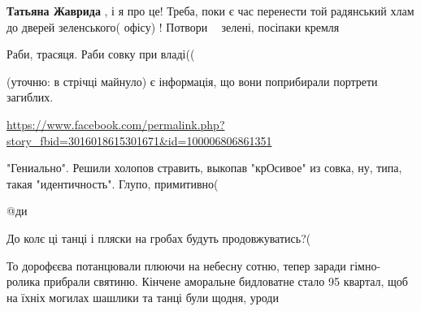 \begin{itemize}
\begin{itemize}
\textbf{Татьяна Жаврида} , і я про це! Треба, поки є час перенести той
радянський хлам до дверей зеленського( офісу) ! Потвори 🤡🤮 зелені, посіпаки
кремля
\end{itemize}

 
Раби, трасяця. Раби совку при владі((

 
(уточню: в стрічці майнуло) є інформація, що вони поприбирали портрети загиблих.

\url{https://www.facebook.com/permalink.php?story_fbid=3016018615301671&id=100006806861351}

 
"Гениально". Решили холопов стравить, выкопав "крОсивое" из совка, ну, типа, такая "идентичность". Глупо, примитивно(

 
@ди

 

До колє ці танці і пляски на гробах будуть продовжуватись?(

То дорофєєва потанцювали плюючи на небесну сотню, тепер заради гімно- ролика
прибрали святиню. Кінчене аморальне бидловатне стало 95 квартал, щоб на їхніх
могилах шашлики та танці були щодня, уроди


\end{itemize}

